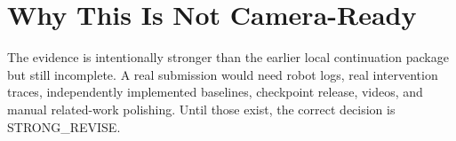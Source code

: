 \documentclass{article}
\begin{document}
\clearpage
\section{Why This Is Not Camera-Ready}
The evidence is intentionally stronger than the earlier local continuation package but still incomplete. A real submission would need robot logs, real intervention traces, independently implemented baselines, checkpoint release, videos, and manual related-work polishing. Until those exist, the correct decision is STRONG\_REVISE.



\end{document}
